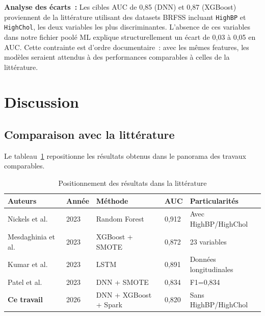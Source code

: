 \textbf{Analyse des écarts~:} Les cibles AUC de 0,85 (DNN) et 0,87 (XGBoost)
proviennent de la littérature utilisant des datasets BRFSS incluant \texttt{HighBP}
et \texttt{HighChol}, les deux variables les plus discriminantes.
L'absence de ces variables dans notre fichier poolé ML explique structurellement
un écart de 0,03 à 0,05 en AUC. Cette contrainte est d'ordre documentaire~:
avec les mêmes features, les modèles seraient attendus à des performances comparables
à celles de la littérature.

\section{Discussion}
\label{sec:discussion}

\subsection{Comparaison avec la littérature}

Le tableau~\ref{tab:etat_art_rappel} repositionne les résultats obtenus dans
le panorama des travaux comparables.

\begin{table}[H]
\centering
\caption{Positionnement des résultats dans la littérature}
\label{tab:etat_art_rappel}
\begin{tabular}{p{3.5cm}p{1.5cm}p{3cm}p{1.5cm}p{3.5cm}}
\toprule
\textbf{Auteurs} & \textbf{Année} & \textbf{Méthode} & \textbf{AUC} & \textbf{Particularités} \\
\midrule
Nickels et al.~\cite{nickels2023}    & 2023 & Random Forest       & 0,912 & Avec HighBP/HighChol \\
Mesdaghinia et al.~\cite{mesdaghinia2023} & 2023 & XGBoost + SMOTE & 0,872 & 23 variables \\
Kumar et al.~\cite{kumar2023}        & 2023 & LSTM                & 0,891 & Données longitudinales \\
Patel et al.~\cite{patel2023}        & 2023 & DNN + SMOTE         & 0,834 & F1=0,834 \\
\midrule
\textbf{Ce travail}                  & 2026 & DNN + XGBoost + Spark & 0,820 & Sans HighBP/HighChol \\
\bottomrule
\end{tabular}
\end{table}

